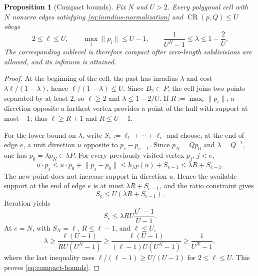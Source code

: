 \documentclass[10pt,a4paper]{amsart}
\newtheorem{proposition}{Proposition}
\DeclareMathOperator{\CR}{CR}
\newcommand{\norm}[1]{\lVert #1\rVert}
\begin{document}
\begin{proposition}[Compact bounds]
\label{prop:compact-bounds}
Fix $N$ and $U>2$. Every polygonal cell with $N$ nonzero edges satisfying \eqref{eq:inradius-normalization} and $\CR(p,Q)\le U$ obeys
\begin{equation}
2\le\ell\le U,
\qquad
\max_i\norm{p_i}\le U-1,
\qquad
\frac{1}{U^N-1}\le\lambda\le1-\frac{2}{U}.
\label{eq:compact-bounds}
\end{equation}
The corresponding sublevel is therefore compact after zero-length subdivisions are allowed, and its infimum is attained.
\end{proposition}

\begin{proof}
At the beginning of the cell, the past has inradius $\lambda$ and cost $\lambda\ell/(1-\lambda)$, hence $\ell/(1-\lambda)\le U$. Since $B_2\subset P$, the cell joins two points separated by at least $2$, so $\ell\ge2$ and $\lambda\le1-2/U$. If $R:=\max_i\norm{p_i}$, a direction opposite a farthest vertex provides a point of the hull with support at most $-1$; thus $\ell\ge R+1$ and $R\le U-1$.

For the lower bound on $\lambda$, write $S_e:=\ell_1+\cdots+\ell_e$ and choose, at the end of edge $e$, a unit direction $u$ opposite to $p_e-p_{e-1}$. Since $p_N=Qp_0$ and $\lambda=Q^{-1}$, one has $p_0=\lambda p_N\in\lambda P$. For every previously visited vertex $p_j$, $j<e$,
\[
u\cdot p_j\le u\cdot p_0+\norm{p_j-p_0}
\le h_{\lambda P}(u)+S_{e-1}
\le\lambda R+S_{e-1}.
\]
The new point does not increase support in direction $u$. Hence the available support at the end of edge $e$ is at most $\lambda R+S_{e-1}$, and the ratio constraint gives
\[
S_e\le U(\lambda R+S_{e-1}).
\]
Iteration yields
\[
S_e\le\lambda R U\frac{U^e-1}{U-1}.
\]
At $e=N$, with $S_N=\ell$, $R\le\ell-1$, and $\ell\le U$,
\[
\lambda\ge
\frac{\ell(U-1)}{RU(U^N-1)}
\ge
\frac{\ell(U-1)}{(\ell-1)U(U^N-1)}
\ge
\frac{1}{U^N-1},
\]
where the last inequality uses $\ell/(\ell-1)\ge U/(U-1)$ for $2\le\ell\le U$.
This proves \eqref{eq:compact-bounds}.
\end{proof}
\end{document}
